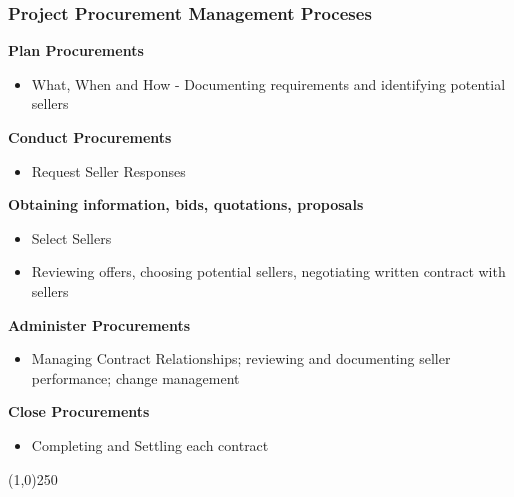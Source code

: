 \begin{frame}
\frametitle{Project Procurement Management \hfill\hfill Proceses} 
\textbf{Plan Procurements}
		\begin{itemize}
			\item What, When and How - Documenting requirements and identifying potential sellers
		\end{itemize}
\textbf{Conduct Procurements}
		\begin{itemize}
			\item Request Seller Responses
		\end{itemize}
\textbf{Obtaining information, bids, quotations, proposals}
		\begin{itemize}
			\item Select Sellers
			\item Reviewing offers, choosing potential sellers, negotiating written contract with sellers
		\end{itemize}
\textbf{Administer Procurements}
		\begin{itemize}
			\item Managing Contract Relationships; reviewing and documenting seller performance; change management
		\end{itemize}
\textbf{Close Procurements}
		\begin{itemize}
			\item Completing and Settling each contract
		\end{itemize}
\end{frame}\begin{center}\line(1,0){250}\end{center}




